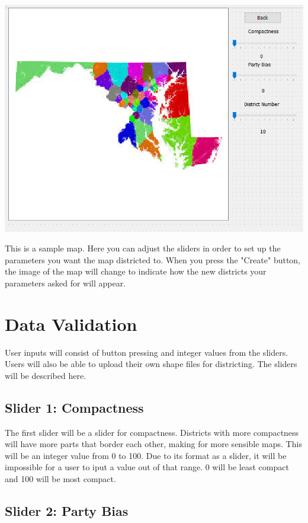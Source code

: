 \documentclass{article}
\begin{document}
\vspace{10mm}
	
\hspace*{5mm}   
\includegraphics[scale=.7]{mapwin.png}

\vspace{5mm}

This is a sample map.  Here you can adjust the sliders in order to set up the parameters you want the map districted to.  When you press the "Create" button, the image of the map will change to indicate how the new districts your parameters asked for will appear.
\section{Data Validation}
User inputs will consist of button pressing and integer values from the sliders.  Users will also be able to upload their own shape files for districting.  The sliders will be described here.

\subsection{Slider 1: Compactness}

The first slider will be a slider for compactness.  Districts with more compactness will have more parts that border each other, making for more sensible maps.  This will be an integer value from 0 to 100.  Due to its format as a slider, it will be impossible for a user to iput a value out of that range.  0 will be least compact and 100 will be most compact.

\subsection{Slider 2: Party Bias}
\end{document}
